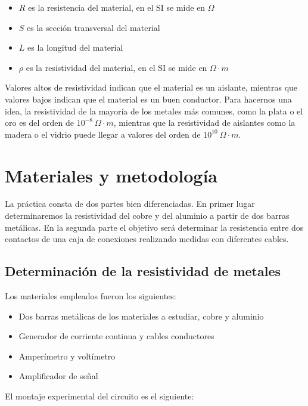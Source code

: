\documentclass[a4paper,12pt,titlepage]{report}
\begin{document}
\newpage

\begin{itemize}
    \item $R$ es la resistencia del material, en el SI se mide en $\Omega$
    \item $S$ es la sección transversal del material
    \item $L$ es la longitud del material
    \item $\rho$ es la resistividad del material, en el SI se mide en $\Omega \cdot m$
\end{itemize}

Valores altos de resistividad indican que el material es un aislante, mientras que valores bajos indican que el material es un buen conductor. Para hacernos una idea, la resistividad de la mayoría de los metales más comunes, como la plata o el oro es del orden de $10^{-8}\: \Omega \cdot m$, mientras que la resistividad de aislantes como la madera o el vidrio puede llegar a valores del orden de $10^{10}\: \Omega \cdot m$.

\section{Materiales y metodología}

La práctica consta de dos partes bien diferenciadas. En primer lugar determinaremos la resistividad del cobre y del aluminio a partir de dos barras metálicas. En la segunda parte el objetivo será determinar la resistencia entre dos contactos de una caja de conexiones realizando medidas con diferentes cables.

\subsection{Determinación de la resistividad de metales}

Los materiales empleados fueron los siguientes:

\begin{itemize}
    \item Dos barras metálicas de los materiales a estudiar, cobre y aluminio
    \item Generador de corriente continua y cables conductores
    \item Amperímetro y voltímetro
    \item Amplificador de señal
\end{itemize}

\newpage

El montaje experimental del circuito es el siguiente:
\end{document}
